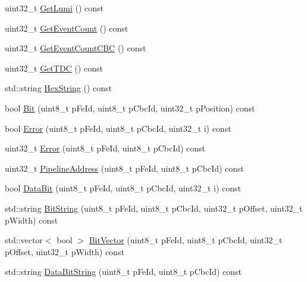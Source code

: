 \begin{DoxyCompactItemize}
uint32\-\_\-t \hyperlink{class_ph2___hw_interface_1_1_event_ae5af75e033d2eb6d76a039e859a9ce86}{Get\-Lumi} () const 
\item 
uint32\-\_\-t \hyperlink{class_ph2___hw_interface_1_1_event_aaebf08f816e8a98f424ba8ab25e32231}{Get\-Event\-Count} () const 
\item 
uint32\-\_\-t \hyperlink{class_ph2___hw_interface_1_1_event_a620592c831036eae724c37db45ca0765}{Get\-Event\-Count\-C\-B\-C} () const 
\item 
uint32\-\_\-t \hyperlink{class_ph2___hw_interface_1_1_event_a2c193b4b2bdb35267f63d03cc684e7b1}{Get\-T\-D\-C} () const 
\item 
std\-::string \hyperlink{class_ph2___hw_interface_1_1_event_a1dd8d9cc8a8169df80518d57b1075d2c}{Hex\-String} () const 
\item 
bool \hyperlink{class_ph2___hw_interface_1_1_event_a5b542b0d98a413feef14cc57cff250bf}{Bit} (uint8\-\_\-t p\-Fe\-Id, uint8\-\_\-t p\-Cbc\-Id, uint32\-\_\-t p\-Position) const 
\item 
bool \hyperlink{class_ph2___hw_interface_1_1_event_ae0242a4b78e3da2959a2bcfb8adb86f9}{Error} (uint8\-\_\-t p\-Fe\-Id, uint8\-\_\-t p\-Cbc\-Id, uint32\-\_\-t i) const 
\item 
uint32\-\_\-t \hyperlink{class_ph2___hw_interface_1_1_event_ab3bbc58be7f96ba0dbc1721eb90d4380}{Error} (uint8\-\_\-t p\-Fe\-Id, uint8\-\_\-t p\-Cbc\-Id) const 
\item 
uint32\-\_\-t \hyperlink{class_ph2___hw_interface_1_1_event_a2597189e1c09b65433df4489f5afbf56}{Pipeline\-Address} (uint8\-\_\-t p\-Fe\-Id, uint8\-\_\-t p\-Cbc\-Id) const 
\item 
bool \hyperlink{class_ph2___hw_interface_1_1_event_a3e93e6f16944f443caffd2df81262fbe}{Data\-Bit} (uint8\-\_\-t p\-Fe\-Id, uint8\-\_\-t p\-Cbc\-Id, uint32\-\_\-t i) const 
\item 
std\-::string \hyperlink{class_ph2___hw_interface_1_1_event_a67261ba2ea976e1c265c8aa7fe1a4b2d}{Bit\-String} (uint8\-\_\-t p\-Fe\-Id, uint8\-\_\-t p\-Cbc\-Id, uint32\-\_\-t p\-Offset, uint32\-\_\-t p\-Width) const 
\item 
std\-::vector$<$ bool $>$ \hyperlink{class_ph2___hw_interface_1_1_event_ab83e11f21873bd5beebd1049671ce3da}{Bit\-Vector} (uint8\-\_\-t p\-Fe\-Id, uint8\-\_\-t p\-Cbc\-Id, uint32\-\_\-t p\-Offset, uint32\-\_\-t p\-Width) const 
\item 
std\-::string \hyperlink{class_ph2___hw_interface_1_1_event_adb005c7fbcd56f6cb66a4b83b185886b}{Data\-Bit\-String} (uint8\-\_\-t p\-Fe\-Id, uint8\-\_\-t p\-Cbc\-Id) const 

\end{DoxyCompactItemize}
